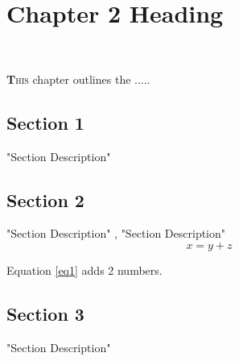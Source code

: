 


\chapter{Chapter 2 Heading}
\HRule \\[2cm] %

\label{Chapter2} %


\begin{spacing}{1.6}

\lettrine[lines=1]{\textbf{T}}{his} chapter outlines the .....  


\section{Section 1}
"Section Description"

\section{Section 2}
"Section Description" \cite{Cite01}, "Section Description"
\begin{equation}
\label{eq2}
x = y + z
\end{equation}

Equation \ref{eq1} adds 2 numbers.


\section{Section 3}
"Section Description"

\end{spacing} 